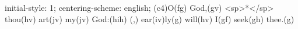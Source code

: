 initial-style: 1;
centering-scheme: english;
(c4)O(fg) God,(gv) <sp>*</sp> thou(hv) art(jv) my(jv) God:(hih) (,) ear(iv)ly(g) will(hv) I(gf) seek(gh) thee.(g)
